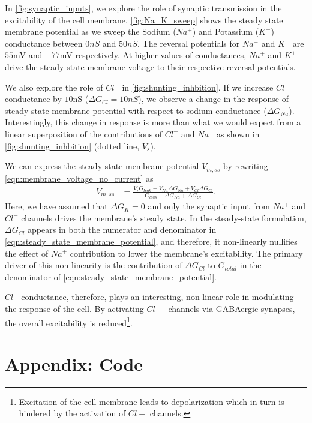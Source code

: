 \documentclass[10pt,onecolumn]{article}
\begin{document}
    In \cref{fig:synaptic_inputs}, we explore the role of synaptic transmission in the excitability of the cell membrane.
    \cref{fig:Na_K_sweep} shows the steady state membrane potential as we sweep the Sodium ($Na^+$) and Potassium ($K^+$) conductance between $0nS$ and $50nS$.
    The reversal potentials for $Na^+$ and $K^+$ are $55$mV and $-77$mV respectively.
    At higher values of conductances, $Na^+$ and $K^+$ drive the steady state membrane voltage to their respective reversal potentials.

    We also explore the role of $Cl^-$ in \cref{fig:shunting_inhbition}.
    If we increase $Cl^-$ conductance by $10$nS ($\Delta{G_{Cl}}=10nS$), we observe a change in the response of steady state membrane potential with respect to sodium conductance ($\Delta{G_{Na}}$).
    Interestingly, this change in response is more than what we would expect from a linear superposition of the contributions of $Cl^-$ and $Na^+$ as shown in \cref{fig:shunting_inhbition} (dotted line, $V_{s}$).

    We can express the steady-state membrane potential $V_{m,ss}$ by rewriting \cref{eqn:membrane_voltage_no_current} as
    \begin{align}
        V_{m,ss} &= \frac{V_{r}G_{leak} + V_{Na}\Delta{G_{Na}} + V_{Cl}\Delta{G_{Cl}}}{G_{leak} + \Delta{G_{Na}} + \Delta{G_{Cl}}}.
        \label{eqn:steady_state_membrane_potential}
    \end{align}
    Here, we have assumed that $\Delta{G_{K}}=0$ and only the synaptic input from $Na^+$ and $Cl^-$ channels drives the membrane's steady state.
    In the steady-state formulation, $\Delta{G_{Cl}}$ appears in both the numerator and denominator in \cref{eqn:steady_state_membrane_potential}, and therefore, it non-linearly nullifies the effect of $Na^+$ contribution to lower the membrane's excitability.
    The primary driver of this non-linearity is the contribution of $\Delta{G_{Cl}}$ to $G_{total}$ in the denominator of \cref{eqn:steady_state_membrane_potential}.

    $Cl^-$ conductance, therefore, plays an interesting, non-linear role in modulating the response of the cell.
    By activating $Cl-$ channels via GABAergic synapses, the overall excitability is reduced\footnote{Excitation of the cell membrane leads to depolarization which in turn is hindered by the activation of $Cl-$ channels.}.

    \section{Appendix: Code}
    \label{sec:appendix_code}
\end{document}

